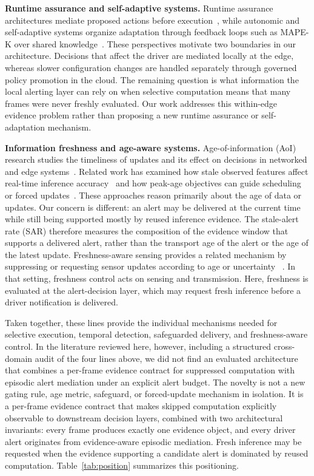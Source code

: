 \documentclass[conference]{IEEEtran}
\begin{document}
\textbf{Runtime assurance and self-adaptive systems.} Runtime assurance
architectures mediate proposed actions before
execution~\cite{seto1998simplex,alshiekh2018shield}, while autonomic and
self-adaptive systems organize adaptation through feedback loops such as
MAPE-K over shared knowledge~\cite{kephart2003,weyns2020}. These
perspectives motivate two boundaries in our architecture. Decisions that
affect the driver are mediated locally at the edge, whereas slower
configuration changes are handled separately through governed policy
promotion in the cloud. The remaining question is what information the
local alerting layer can rely on when selective computation means that
many frames were never freshly evaluated. Our work addresses this
within-edge evidence problem rather than proposing a new runtime
assurance or self-adaptation mechanism.

\textbf{Information freshness and age-aware systems.} Age-of-information
(AoI) research studies the timeliness of updates and its effect on
decisions in networked and edge systems~\cite{yates2021aoi}. Related work has examined
how stale observed features affect real-time inference
accuracy~\cite{shisher2022freshness} and how peak-age objectives can guide
scheduling or forced updates~\cite{zhu2026paoi}. These approaches reason
primarily about the age of data or updates. Our concern is different: an
alert may be delivered at the current time while still being supported
mostly by reused inference evidence. The stale-alert rate (SAR) therefore
measures the composition of the evidence window that supports a delivered
alert, rather than the transport age of the alert or the age of the latest
update. Freshness-aware sensing provides a related mechanism by suppressing
or requesting sensor updates according to age or uncertainty
~\cite{bui2024timely}. In that setting, freshness control acts on sensing
and transmission. Here, freshness is evaluated at the alert-decision
layer, which may request fresh inference before a driver notification is
delivered.

Taken together, these lines provide the individual mechanisms needed for
selective execution, temporal detection, safeguarded delivery, and
freshness-aware control. In the literature reviewed here, however,
including a structured cross-domain audit of the four lines above, we
did not find an evaluated architecture that combines a per-frame evidence
contract for suppressed computation with episodic alert mediation under an
explicit alert budget. The novelty is not a new gating rule, age
metric, safeguard, or forced-update mechanism in isolation. It is a
per-frame evidence contract that makes skipped computation explicitly
observable to downstream decision layers, combined with two
architectural invariants: every frame produces exactly one evidence
object, and every driver alert originates from evidence-aware episodic
mediation. Fresh inference may be requested when the evidence
supporting a candidate alert is dominated by reused computation. Table~\ref{tab:position} summarizes this
positioning.
\end{document}

